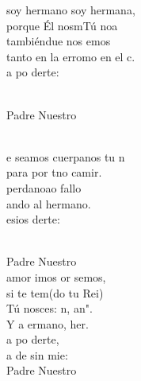 \documentclass[12pt]{article}
\begin{document}
\begin{multicols*}{2}
\begin{cancion}%
	 soy hermano soy  hermana,\\
	porque Él nosmTú noa\\
	tambiéndue nos emos\\
	tanto en la erromo en el c.\\
	a po derte:\\\jump\\
	\begin{chorus}%
	Padre Nuestro   \\
	\end{chorus}%
	\jump\\
	e seamos cuerpanos tu n \\
	para por tno camir.\\
	perdanoao fallo\\
	ando al hermano.\\
	esios derte:\\\jump\\
	\begin{chorus}%
	Padre Nuestro   \\
	 amor imos or semos,\\
	si te tem(do tu Rei)\\
	Tú nosces: n, an".  \\
	Y a ermano, her.\\
	a po derte,\\
	a de sin mie:\\
	Padre Nuestro   \\
	\end{chorus}%
	\jump\\
\end{cancion}%


\end{multicols*}
\end{document}
